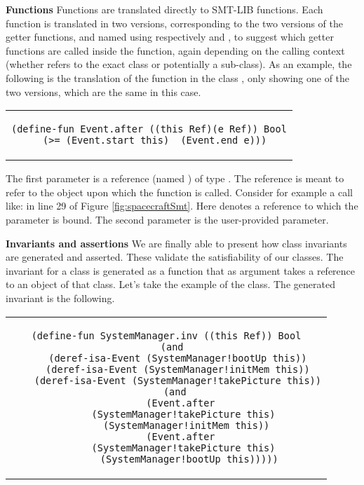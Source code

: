 \textbf{Functions} Functions are translated directly to SMT-LIB
functions.  Each function is translated in two versions, corresponding
to the two versions of the getter functions, and named using
respectively  and
, to suggest which getter functions are
called inside the function, again depending on the calling context
(whether  refers to the exact class or potentially a
sub-class). As an example, the following is the translation of the
 function in the class , only showing one of
the two versions, which are the same in this case.

\begin{center}
\begin{tabular}{c}
\begin{lstlisting}
(define-fun Event.after ((this Ref)(e Ref)) Bool
  (>= (Event.start this)  (Event.end e)))
\end{lstlisting}
\end{tabular}
\end{center}

\noindent The first parameter is a reference (named ) of
type . The  reference is meant to refer to the
object upon which the function is called. Consider for example a call
like:  in line 29 of Figure
\ref{fig:spacecraftSmt}. Here  denotes a reference
to which the parameter  is bound.  The second parameter is
the user-provided parameter.


\textbf{Invariants and assertions} We are finally able to present how
class invariants are generated and asserted. These validate the
satisfiability of our classes.  The invariant for a class is generated
as a function that as argument takes a  reference to an
object of that class. Let's take the example of the
 class. The generated invariant is the following.

\begin{center}
\begin{tabular}{c}
\begin{lstlisting}
(define-fun SystemManager.inv ((this Ref)) Bool
  (and
    (deref-isa-Event (SystemManager!bootUp this))
    (deref-isa-Event (SystemManager!initMem this))
    (deref-isa-Event (SystemManager!takePicture this))
    (and 
      (Event.after 
        (SystemManager!takePicture this)  
        (SystemManager!initMem this)) 
      (Event.after 
        (SystemManager!takePicture this)  
        (SystemManager!bootUp this)))))
\end{lstlisting}
\end{tabular}
\end{center}

